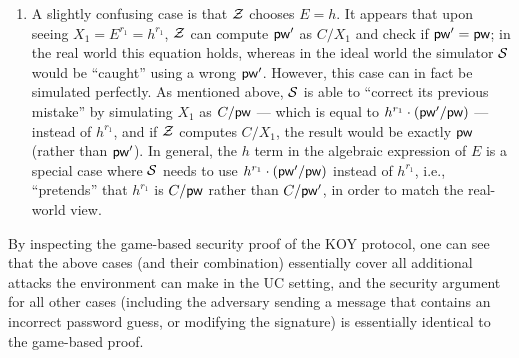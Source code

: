 \begin{enumerate}
	\item A slightly confusing case is that $\mathcal{Z}$ chooses $E = h$. It appears that upon seeing $X_1 = E^{r_1} = h^{r_1}$, $\mathcal{Z}$ can compute $\mathsf{pw}'$ as $C/X_1$ and check if $\mathsf{pw}' = \mathsf{pw}$; in the real world this equation holds, whereas in the ideal world the simulator $\mathcal{S}$ would be ``caught'' using a wrong $\mathsf{pw}'$. However, this case can in fact be simulated perfectly. As mentioned above, $\mathcal{S}$ is able to ``correct its previous mistake'' by simulating $X_1$ as $C/\mathsf{pw}$ --- which is equal to $h^{r_1}\cdot(\mathsf{pw}'/\mathsf{pw})$ --- instead of $h^{r_1}$, and if $\mathcal{Z}$ computes $C/X_1$, the result would be exactly $\mathsf{pw}$ (rather than $\mathsf{pw}'$). In general, the $h$ term in the algebraic expression of $E$ is a special case where $\mathcal{S}$ needs to use $h^{r_1}\cdot(\mathsf{pw}'/\mathsf{pw})$ instead of $h^{r_1}$, i.e., ``pretends'' that $h^{r_1}$ is $C/\mathsf{pw}$ rather than $C/\mathsf{pw}'$, in order to match the real-world view.

\end{enumerate}
By inspecting the game-based security proof of the KOY protocol, one can see that the above cases (and their combination) essentially cover all additional attacks the environment can make in the UC setting, and the security argument for all other cases (including the adversary sending a message that contains an incorrect password guess, or modifying the signature) is essentially identical to the game-based proof. 